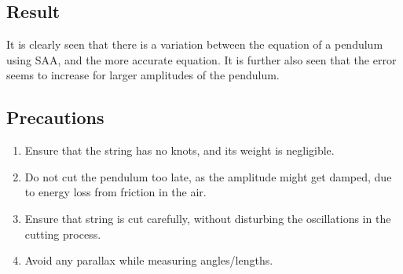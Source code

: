  \subsection{Result}
  It is clearly seen that there is a variation between the equation of a pendulum using SAA, and the more accurate equation. It is further also seen that the error seems to increase for larger amplitudes of the pendulum.
\subsection{Precautions}
\begin{enumerate}
\item Ensure that the string has no knots, and its weight is negligible.
\item Do not cut the pendulum too late, as the amplitude might get damped, due to energy loss from friction in the air.
\item Ensure that string is cut carefully, without disturbing the oscillations in the cutting process.
\item Avoid any parallax while measuring angles/lengths.
\end{enumerate}



  

                                                                           
